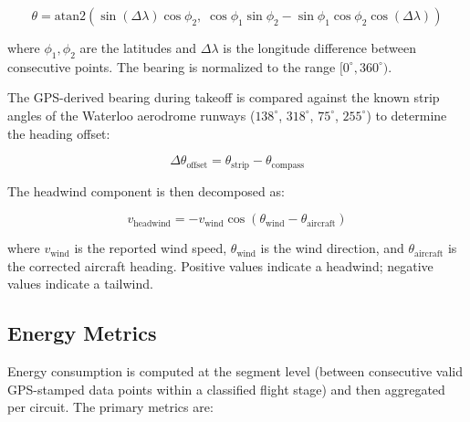 \documentclass[11pt,a4paper]{article}
\begin{document}
\begin{equation}
    \theta = \mathrm{atan2}\!\left(\sin(\Delta\lambda)\cos\phi_2,\;\cos\phi_1\sin\phi_2 - \sin\phi_1\cos\phi_2\cos(\Delta\lambda)\right)
\end{equation}

\noindent where $\phi_1, \phi_2$ are the latitudes and $\Delta\lambda$ is the longitude difference between consecutive points.
The bearing is normalized to the range $[0^\circ, 360^\circ)$.

The GPS-derived bearing during takeoff is compared against the known strip angles of the Waterloo aerodrome runways ($138^\circ$, $318^\circ$, $75^\circ$, $255^\circ$) to determine the heading offset:

\begin{equation}
    \Delta\theta_{\mathrm{offset}} = \theta_{\mathrm{strip}} - \theta_{\mathrm{compass}}
\end{equation}

The headwind component is then decomposed as:

\begin{equation}
    v_{\mathrm{headwind}} = -v_{\mathrm{wind}} \cos(\theta_{\mathrm{wind}} - \theta_{\mathrm{aircraft}})
\end{equation}

\noindent where $v_{\mathrm{wind}}$ is the reported wind speed, $\theta_{\mathrm{wind}}$ is the wind direction, and $\theta_{\mathrm{aircraft}}$ is the corrected aircraft heading.
Positive values indicate a headwind; negative values indicate a tailwind.

\subsection{Energy Metrics}

Energy consumption is computed at the segment level (between consecutive valid GPS-stamped data points within a classified flight stage) and then aggregated per circuit.
The primary metrics are:
\end{document}
